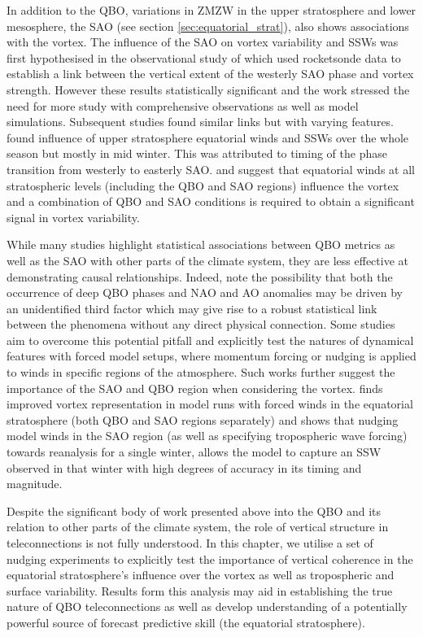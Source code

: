 In addition to the QBO, variations in ZMZW in the upper stratosphere and lower mesosphere, the SAO (see section \ref{sec:equatorial_strat}), also shows associations with the vortex. The influence of the SAO on vortex variability and SSWs was first hypothesised in the observational study of \cite{JGray2001} which used rocketsonde data to establish a link between the vertical extent of the westerly SAO phase and vortex strength. However these results statistically significant and the work stressed the need for more study with comprehensive observations as well as model simulations. Subsequent studies found similar links but with varying features. \cite{Gray2003} found influence of upper stratosphere equatorial winds and SSWs over the whole season but mostly in mid winter. This was attributed to timing of the phase transition from westerly to easterly SAO. \cite{JGray2001} and \cite{Hamilton} suggest that equatorial winds at all stratospheric levels (including the QBO and SAO regions) influence the vortex and a combination of QBO and SAO conditions is required to obtain a significant signal in vortex variability.

While many studies highlight statistical associations between QBO metrics as well as the SAO with other parts of the climate system, they are less effective at demonstrating causal relationships. Indeed, \cite{andrewsObserved2019} note the possibility that both the occurrence of deep QBO phases and NAO and AO anomalies may be driven by an unidentified third factor which may give rise to a robust statistical link between the phenomena without any direct physical connection. Some studies aim to overcome this potential pitfall and explicitly test the natures of dynamical features with forced model setups, where momentum forcing or nudging is applied to winds in specific regions of the atmosphere. Such works further suggest the importance of the SAO and QBO region when considering the vortex. \cite{Pascoe2005} finds improved vortex representation in model runs with forced winds in the equatorial stratosphere (both QBO and SAO regions separately) and \cite{Brown2019} shows that nudging model winds in the SAO region (as well as specifying tropospheric wave forcing) towards reanalysis for a single winter, allows the model to capture an SSW observed in that winter with high degrees of accuracy in its timing and magnitude.   

Despite the significant body of work presented above into the QBO and its relation to other parts of the climate system, the role of vertical structure in teleconnections is not fully understood. In this chapter, we utilise a set of nudging experiments to explicitly test the importance of vertical coherence in the equatorial stratosphere's influence over the vortex as well as tropospheric and surface variability. Results form this analysis may aid in establishing the true nature of QBO teleconnections as well as develop understanding of a potentially powerful source of forecast predictive skill (the equatorial stratosphere).

